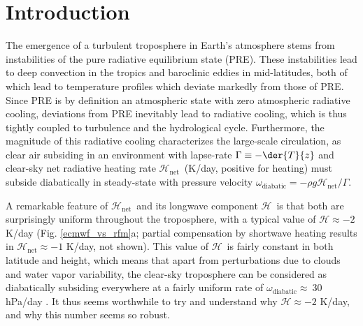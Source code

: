 \documentclass[10pt]{article}
\newcommand{\ch}{\ensuremath{\mathcal{H}}}
\newcommand{\chnet}{\ensuremath{\ch_\mathrm{net}}}
\newcommand{\omegadiab}{\ensuremath{\omega_{\mathrm{diabatic}}}}
\begin{document}
%
%


\section {Introduction}
The emergence of a turbulent troposphere in Earth's atmosphere stems from instabilities of the pure radiative equilibrium state (PRE). These instabilities lead to deep convection in the tropics and baroclinic eddies in mid-latitudes, both of which lead to temperature profiles which deviate markedly from those of PRE.  Since PRE is by definition an atmospheric state with zero atmospheric radiative cooling, deviations from PRE inevitably lead to radiative cooling, which is thus tightly coupled to turbulence and the hydrological cycle. Furthermore, the magnitude of this radiative cooling characterizes the large-scale circulation, as clear air subsiding in an environment with lapse-rate $\Gamma \equiv - \der{T}{z}$ and clear-sky net radiative heating rate \chnet\ (K/day, positive for heating)  must subside diabatically in steady-state with pressure velocity $\omegadiab   =  - \rho g\chnet/\Gamma$.

A remarkable feature of \chnet\ and its longwave component \ch\  is that both are  surprisingly uniform throughout the troposphere,  with a typical value of $\ch\approx -2 $K/day  (Fig. \ref{ecmwf_vs_rfm}a; partial compensation by shortwave heating results in $\chnet\approx -1$ K/day, not shown). This value of \ch\ is fairly constant in both latitude and height, which means that apart from perturbations  due to clouds and water vapor variability, the clear-sky troposphere can be considered as diabatically subsiding everywhere at a fairly uniform rate of $\omegadiab\approx\ 30$ hPa/day . It thus seems worthwhile to try and understand why $\ch \approx -2$ K/day, and why this number seems so robust.
\end{document}

